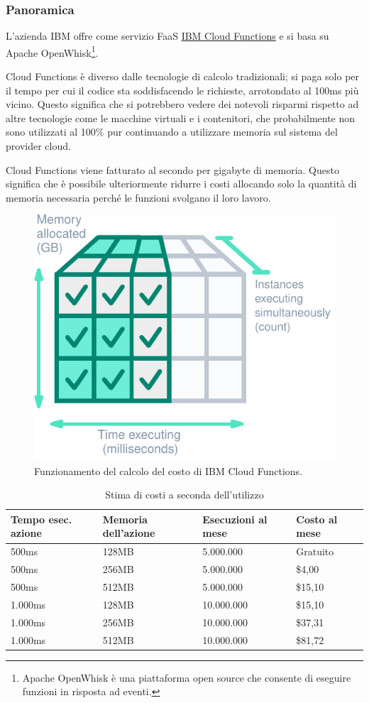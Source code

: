 \documentclass[a4paper]{article}
\begin{document}
	\subsubsection{Panoramica}
	
	L'azienda IBM offre come servizio FaaS \href{https://cloud.ibm.com/functions/}{IBM Cloud Functions} e si basa su Apache OpenWhisk\footnote{Apache OpenWhisk è una piattaforma open source che consente di eseguire funzioni in risposta ad eventi.}. 	
	
	Cloud Functions è diverso dalle tecnologie di calcolo tradizionali; si paga solo per il tempo per cui il codice sta soddisfacendo le richieste, arrotondato al 100ms più vicino. Questo significa che si potrebbero vedere dei notevoli risparmi rispetto ad altre tecnologie come le macchine virtuali e i contenitori, che probabilmente non sono utilizzati al 100\% pur continuando a utilizzare memoria sul sistema del provider cloud.
	
	Cloud Functions viene fatturato al secondo per gigabyte di memoria. Questo significa che è possibile ulteriormente ridurre i costi allocando solo la quantità di memoria necessaria perché le funzioni svolgano il loro lavoro.
	\begin{figure}[!htp]
		\centering
		\includegraphics[width=.6\textwidth]{img/IBM-1.pdf}
		\caption{Funzionamento del calcolo del costo di IBM Cloud Functions.}
	\end{figure}
	
	\begin{table}[!htp]
		\centering
		\begin{tabular}{@{} l l l l @{}}
			\toprule
			Tempo esec. azione & Memoria dell'azione & Esecuzioni al mese & Costo al mese \\
			\midrule
			500ms	& 128MB & 5.000.000		& Gratuito \\
			500ms	& 256MB & 5.000.000		& \$4,00 \\
			500ms	& 512MB & 5.000.000		& \$15,10 \\
			1.000ms	& 128MB & 10.000.000	& \$15,10 \\
			1.000ms	& 256MB & 10.000.000	& \$37,31 \\
			1.000ms	& 512MB & 10.000.000	& \$81,72 \\
			\bottomrule
		\end{tabular}
		\caption{Stima di costi a seconda dell'utilizzo}
	\end{table}
	
\end{document}
